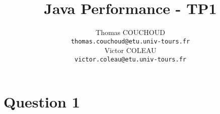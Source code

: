 \documentclass{report}
\title{Java Performance - TP1}
\author{Thomas COUCHOUD\\\texttt{thomas.couchoud@etu.univ-tours.fr}\\Victor COLEAU\\\texttt{victor.coleau@etu.univ-tours.fr}}
\begin{document}
	\mccTitle
	
	\chapter{Question 1}
				
\end{document}
